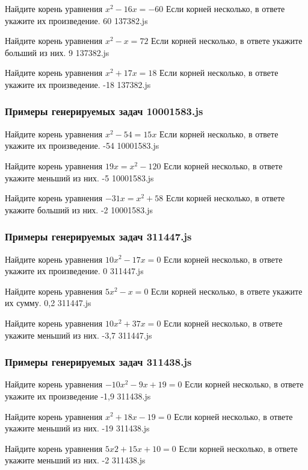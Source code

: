 \par{Найдите корень уравнения $x^2−16x=−60$ Если корней несколько, в ответе укажите их произведение. }{ 60 }{137382.js}
\par{Найдите корень уравнения $x^2−x=72$ Если корней несколько, в ответе укажите больший из них. }{ 9 }{137382.js}
\par{Найдите корень уравнения $x^2+17x=18$ Если корней несколько, в ответе укажите их произведение. }{ -18 }{137382.js}


\subsubsection*{Примеры генерируемых задач 10001583.js}   

\par{Найдите корень уравнения $x^2−54=15x$ Если корней несколько, в ответе укажите их произведение. }{ -54 }{10001583.js}
\par{Найдите корень уравнения $19x=x^2−120$ Если корней несколько, в ответе укажите меньший из них. }{ -5 }{10001583.js}
\par{Найдите корень уравнения $−31x=x^2+58$ Если корней несколько, в ответе укажите больший из них. }{ -2 }{10001583.js}


\subsubsection*{Примеры генерируемых задач 311447.js}   

\par{Найдите корень уравнения $10x^2−17x=0$ Если корней несколько, в ответе укажите их произведение. }{ 0 }{311447.js}
\par{Найдите корень уравнения $5x^2−x=0$ Если корней несколько, в ответе укажите их сумму. }{ 0,2 }{311447.js}
\par{Найдите корень уравнения $10x^2+37x=0$ Если корней несколько, в ответе укажите меньший из них. }{ -3,7 }{311447.js}


\subsubsection*{Примеры генерируемых задач 311438.js}   

\par{Найдите корень уравнения $−10x^2−9x+19=0$ Если корней несколько, в ответе укажите их произведение }{ -1,9 }{311438.js}
\par{Найдите корень уравнения $x^2+18x−19=0$ Если корней несколько, в ответе укажите меньший из них. }{ -19 }{311438.js}
\par{Найдите корень уравнения $5x2+15x+10=0$ Если корней несколько, в ответе укажите меньший из них. }{ -2 }{311438.js}

